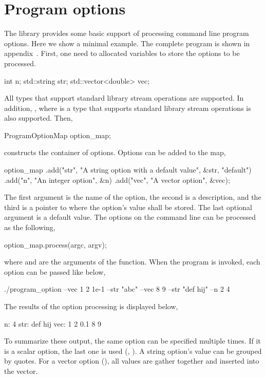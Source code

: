 \section{Program options}
\label{sec:Program options}

The library provides some basic support of processing command line program
options. Here we show a minimal example. The complete program is shown in
appendix~. First, one need to
allocated variables to store the options to be processed.
\begin{cppcode}
  int n;
  std::string str;
  std::vector<double> vec;
\end{cppcode}
All types that support standard library \io stream operations are supported. In
addition, , where  is a type that
supports standard library \io stream operations is also supported. Then,
\begin{cppcode}
  ProgramOptionMap option_map;
\end{cppcode}
constructs the container of options. Options can be added to the map,
\begin{cppcode}
  option_map
      .add("str", "A string option with a default value", &str, "default")
      .add("n", "An integer option", &n)
      .add("vec", "A vector option", &vec);
\end{cppcode}
The first argument is the name of the option, the second is a description, and
the third is a pointer to where the option's value shall be stored. The last
optional argument is a default value. The options on the command line can be
processed as the following,
\begin{cppcode}
  option_map.process(argc, argv);
\end{cppcode}
where  and  are the arguments of the
 function. When the program is invoked, each option can be
passed like below,
\begin{textcode}
  ./program_option --vec 1 2 1e-1 --str "abc" --vec 8 9 --str "def hij" --n 2 4
\end{textcode}
The results of the option processing is displayed below,
\begin{textcode}
  n: 4
  str: def hij
  vec: 1 2 0.1 8 9
\end{textcode}
To summarize these output, the same option can be specified multiple times. If
it is a scalar option, the last one is used (,
). A string option's value can be grouped by quotes. For a
vector option (), all values are gather together and inserted
into the vector.

